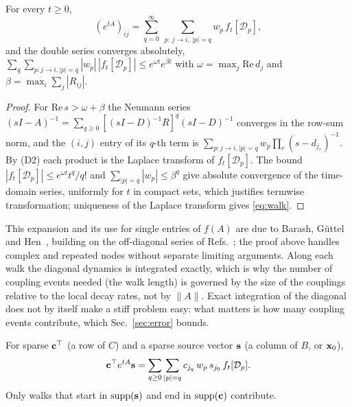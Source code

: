 \begin{proposition}\label{prop:walk}
For every $t\ge0$,
\begin{equation}\label{eq:walk}
(e^{tA})_{ij}=\sum_{q=0}^{\infty}\ \sum_{p:\,j\to i,\ |p|=q} w_p\, f_t[\mathcal{D}_p],
\end{equation}
and the double series converges absolutely, $\sum_q\sum_{p:j\to i,|p|=q}|w_p|\,|f_t[\mathcal{D}_p]|\le e^{\omega t}e^{\beta t}$ with $\omega=\max_j\mathrm{Re}\,d_j$ and $\beta=\max_i\sum_j|R_{ij}|$.
\end{proposition}
\begin{proof}
For $\mathrm{Re}\,s>\omega+\beta$ the Neumann series $(sI-A)^{-1}=\sum_{q\ge0}[(sI-D)^{-1}R]^q(sI-D)^{-1}$ converges in the row-sum norm, and the $(i,j)$ entry of its $q$-th term is $\sum_{p:j\to i,|p|=q}w_p\prod_r(s-d_{j_r})^{-1}$. By (D2) each product is the Laplace transform of $f_t[\mathcal{D}_p]$. The bound $|f_t[\mathcal{D}_p]|\le e^{\omega t}t^q/q!$ and $\sum_{|p|=q}|w_p|\le\beta^q$ give absolute convergence of the time-domain series, uniformly for $t$ in compact sets, which justifies termwise transformation; uniqueness of the Laplace transform gives \eqref{eq:walk}.
\end{proof}
This expansion and its use for single entries of $f(A)$ are due to Barash, G\"uttel and Hen~\cite{barash2022}, building on the off-diagonal series of Refs.~\cite{albash2017,gupta2020pmr}; the proof above handles complex and repeated nodes without separate limiting arguments. Along each walk the diagonal dynamics is integrated exactly, which is why the number of coupling events needed (the walk length) is governed by the size of the couplings relative to the local decay rates, not by $\|A\|$. Exact integration of the diagonal does not by itself make a stiff problem easy: what matters is how many coupling events contribute, which Sec.~\ref{sec:error} bounds.

For sparse ${\bf c}^\top$ (a row of $C$) and a sparse source vector ${\bf s}$ (a column of $B$, or ${\bf x}_0$),
\begin{equation}\label{eq:io_walk}
{\bf c}^\top e^{tA}{\bf s}=\sum_{q\ge0}\sum_{|p|=q} c_{j_q}\,w_p\,s_{j_0}\,f_t[\mathcal{D}_p].
\end{equation}
Only walks that start in $\mathrm{supp}({\bf s})$ and end in $\mathrm{supp}({\bf c})$ contribute.

